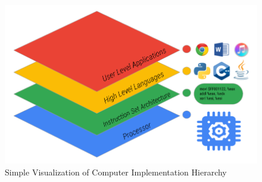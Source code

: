 \begin{figure}[H]
\begin{center}
\includegraphics[width=\linewidth]{chapters/chapter1/img/computerHierarchy.png}
\caption{Simple Visualization of Computer Implementation Hierarchy}
\label{fig:computerHierarchy}
\end{center}
\end{figure}